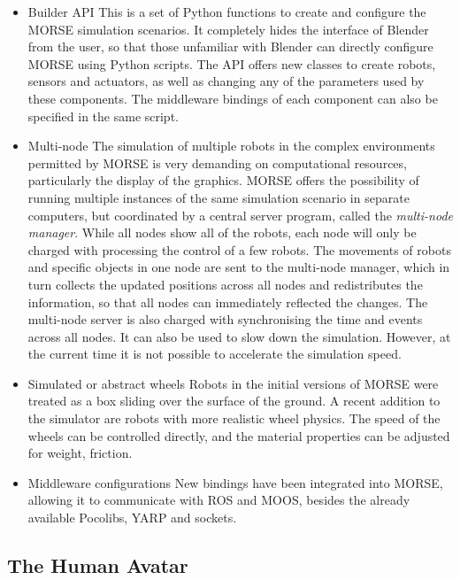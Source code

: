 \documentclass{llncs}
\begin{document}
\begin{itemize}
  \item Builder API
    This is a set of Python functions to create and configure the MORSE
    simulation scenarios. It completely hides the interface of Blender from the
    user, so that those unfamiliar with Blender can directly configure MORSE
    using Python scripts. The API offers new classes to create robots, sensors
    and actuators, as well as changing any of the parameters used by these
    components. The middleware bindings of each component can also be specified
    in the same script.
  \item Multi-node
    The simulation of multiple robots in the complex environments permitted by
    MORSE is very demanding on computational resources, particularly the
    display of the graphics. MORSE offers the possibility of running multiple
    instances of the same simulation scenario in separate computers, but
    coordinated by a central server program, called the \emph{multi-node
    manager}. While all nodes show all of the robots, each node will only
    be charged with processing the control of a few robots. The movements
    of robots and specific objects in one node are sent to the multi-node
    manager, which in turn collects the updated positions across all nodes
    and redistributes the information, so that all nodes can immediately
    reflected the changes.  The multi-node server is also charged with
    synchronising the time and events across all nodes. It can also be used
    to slow down the simulation. However, at the current time it is not
    possible to accelerate the simulation speed.
  \item Simulated or abstract wheels
    Robots in the initial versions of MORSE were treated as a box sliding over
    the surface of the ground. A recent addition to the simulator are robots
    with more realistic wheel physics. The speed of the wheels can be
    controlled directly, and the material properties can be adjusted for
    weight, friction.
  \item Middleware configurations
    New bindings have been integrated into MORSE, allowing it to communicate
    with ROS and MOOS, besides the already available Pocolibs, YARP and
    sockets.
\end{itemize}

\subsection{The Human Avatar}
\end{document}
